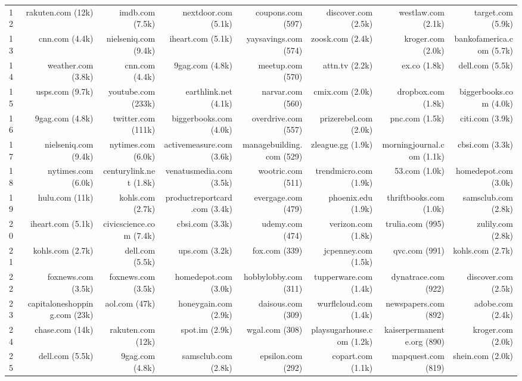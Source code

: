 \begin{table}[htbp]
\begin{adjustbox}{max width=\textwidth}
\begin{tabular}{lrrrrrrr}
12 & rakuten.com (12k) & imdb.com (7.5k) & nextdoor.com (5.1k) & coupons.com (597) & discover.com (2.5k) & westlaw.com (2.1k) & target.com (5.9k) \\
13 & cnn.com (4.4k) & nielseniq.com (9.4k) & iheart.com (5.1k) & yaysavings.com (574) & zoosk.com (2.4k) & kroger.com (2.0k) & bankofamerica.com (5.7k) \\
14 & weather.com (3.8k) & cnn.com (4.4k) & 9gag.com (4.8k) & meetup.com (570) & attn.tv (2.2k) & ex.co (1.8k) & dell.com (5.5k) \\
15 & usps.com (9.7k) & youtube.com (233k) & earthlink.net (4.1k) & narvar.com (560) & cmix.com (2.0k) & dropbox.com (1.8k) & biggerbooks.com (4.0k) \\
16 & 9gag.com (4.8k) & twitter.com (111k) & biggerbooks.com (4.0k) & overdrive.com (557) & prizerebel.com (2.0k) & pnc.com (1.5k) & citi.com (3.9k) \\
17 & nielseniq.com (9.4k) & nytimes.com (6.0k) & activemeasure.com (3.6k) & managebuilding.com (529) & zleague.gg (1.9k) & morningjournal.com (1.1k) & cbsi.com (3.3k) \\
18 & nytimes.com (6.0k) & centurylink.net (1.8k) & venatusmedia.com (3.5k) & wootric.com (511) & trendmicro.com (1.9k) & 53.com (1.0k) & homedepot.com (3.0k) \\
19 & hulu.com (11k) & kohls.com (2.7k) & productreportcard.com (3.4k) & evergage.com (479) & phoenix.edu (1.9k) & thriftbooks.com (1.0k) & samsclub.com (2.8k) \\
20 & iheart.com (5.1k) & civicscience.com (7.4k) & cbsi.com (3.3k) & udemy.com (474) & verizon.com (1.8k) & trulia.com (995) & zulily.com (2.8k) \\
21 & kohls.com (2.7k) & dell.com (5.5k) & ups.com (3.2k) & fox.com (339) & jcpenney.com (1.5k) & qvc.com (991) & kohls.com (2.7k) \\
22 & foxnews.com (3.5k) & foxnews.com (3.5k) & homedepot.com (3.0k) & hobbylobby.com (311) & tupperware.com (1.4k) & dynatrace.com (922) & discover.com (2.5k) \\
23 & capitaloneshopping.com (23k) & aol.com (47k) & honeygain.com (2.9k) & daisous.com (309) & wurflcloud.com (1.4k) & newspapers.com (892) & adobe.com (2.4k) \\
24 & chase.com (14k) & rakuten.com (12k) & spot.im (2.9k) & wgal.com (308) & playsugarhouse.com (1.2k) & kaiserpermanente.org (890) & kroger.com (2.0k) \\
25 & dell.com (5.5k) & 9gag.com (4.8k) & samsclub.com (2.8k) & epsilon.com (292) & copart.com (1.1k) & mapquest.com (819) & shein.com (2.0k) \\

\end{tabular}
\end{adjustbox}
\end{table}
